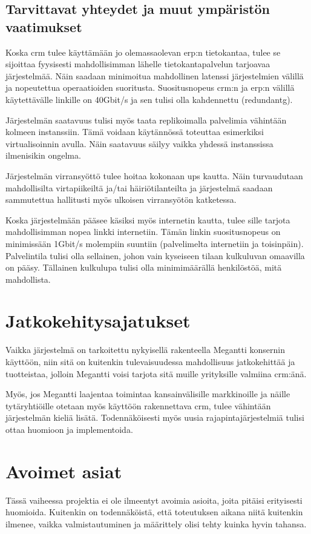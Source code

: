     \subsection{Tarvittavat yhteydet ja muut ympäristön vaatimukset}  %
        Koska \gls{crm} tulee käyttämään jo olemassaolevan \gls{erp}:n tietokantaa, tulee se sijoittaa fyysisesti mahdollisimman lähelle tietokantapalvelun
        tarjoavaa järjestelmää. Näin saadaan minimoitua mahdollinen latenssi järjestelmien välillä ja nopeutettua operaatioiden suoritusta. Suositusnopeus 
        \gls{crm}:n ja \gls{erp}:n välillä käytettävälle linkille on 40Gbit/s ja sen tulisi olla kahdennettu (\gls{redundantg}). \cite{crm}

        Järjestelmän saatavuus tulisi myös taata replikoimalla palvelimia vähintään kolmeen instanssiin. Tämä voidaan käytännössä toteuttaa esimerkiksi virtualisoinnin avulla. Näin saatavuus säilyy vaikka yhdessä instanssissa ilmenisikin ongelma. 
        
        Järjestelmän virransyöttö tulee hoitaa kokonaan \gls{ups} kautta. Näin turvaudutaan mahdollisilta virtapiikeiltä ja/tai häiriötilanteilta ja järjestelmä saadaan
        sammutettua hallitusti myös ulkoisen virransyötön katketessa. 
        
        Koska järjestelmään pääsee käsiksi myös internetin kautta, tulee sille tarjota mahdollisimman nopea linkki internetiin. Tämän linkin suositusnopeus on minimissään 
        1Gbit/s molempiin suuntiin (palvelimelta internetiin ja toisinpäin). 
        Palvelintila tulisi olla sellainen, johon vain kyseiseen tilaan kulkuluvan omaavilla on pääsy. Tällainen kulkulupa tulisi olla minimimäärällä henkilöstöä, mitä mahdollista. 

\section{Jatkokehitysajatukset}     %

    Vaikka järjestelmä on tarkoitettu nykyisellä rakenteella Megantti konser\-nin käyt\-töön, niin sitä on kuitenkin tulevai\-suudes\-sa
    mahdollisuus jatkokehittää ja tuotteistaa, jolloin Megantti voisi tarjota sitä muille yrityksille valmiina \gls{crm}:änä.

    Myös, jos Megantti laajentaa toimintaa kansainvälisille markkinoille ja näille tytär\-yhtiöil\-le otetaan myös käyttöön raken\-net\-tava
    \gls{crm}, tulee vähintään järjestelmän kieliä lisätä. Todennäköisesti myös uusia rajapintajärjestelmiä tulisi ottaa huomioon ja implementoida.

\section{Avoimet asiat}     %

    Tässä vaiheessa projektia ei ole ilmeentyt avoimia asioita, joita pitäisi erityisesti huomioida. Kuitenkin on todennäköistä, että toteutuksen aikana niitä kuitenkin
    ilmenee, vaikka valmistautuminen ja määrittely olisi tehty kuinka hyvin tahansa.




   
